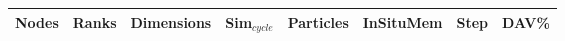 \begingroup
\setlength{\tabcolsep}{-2pt}
\begin{table*}[!h]
\vspace{-8mm}
\begin{tabular}{|P{1.1cm}|P{1.1cm}|P{2.7cm}|P{1.3cm}|P{1.5cm}|P{1.9cm}|P{1.7cm}|P{1.7cm}|}
\hline
Nodes & Ranks & Dimensions & \textbf{Sim$_{cycle}$} & Particles & \textbf{InSituMem} & \textbf{Step} & \textbf{DAV\%} \\ 
\hline

\end{tabular}
\end{table*}
